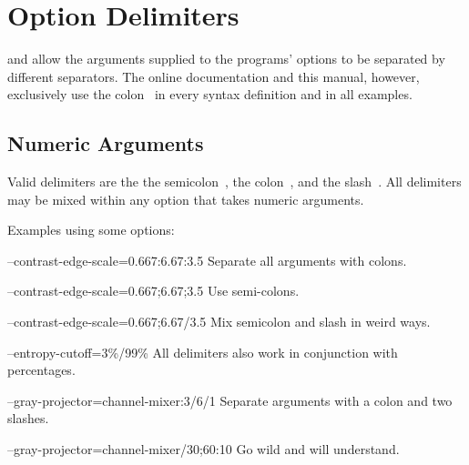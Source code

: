 

\section[Option Delimiters\commonpart]{\label{sec:option-delimiters}%
  Option Delimiters\commonpart}

 and  allow the arguments supplied to the programs'
options to be separated by different separators.  The online documentation and this manual,
however, exclusively use the colon~\sample{:} in every syntax definition and in all examples.


\subsection[Numeric Arguments]{\label{sec:option-delimiters-numeric-arguments}%
  Numeric Arguments}

Valid delimiters are the the semicolon~\sample{;}, the colon~\sample{:}, and the
slash~\sample{/}.  All delimiters may be mixed within any option that takes numeric arguments.

Examples using some  options:

\begin{codelist}
\item[--contrast-edge-scale=0.667:6.67:3.5]\itemend
  Separate all arguments with colons.

\item[--contrast-edge-scale=0.667;6.67;3.5]\itemend
  Use semi-colons.

\item[--contrast-edge-scale=0.667;6.67/3.5]\itemend
  Mix semicolon and slash in weird ways.

\item[--entropy-cutoff=3\%/99\%]\itemend
  All delimiters also work in conjunction with percentages.

\item[--gray-projector=channel-mixer:3/6/1]\itemend
  Separate arguments with a colon and two slashes.

\item[--gray-projector=channel-mixer/30;60:10]\itemend
  Go wild and  will understand.
\end{codelist}


